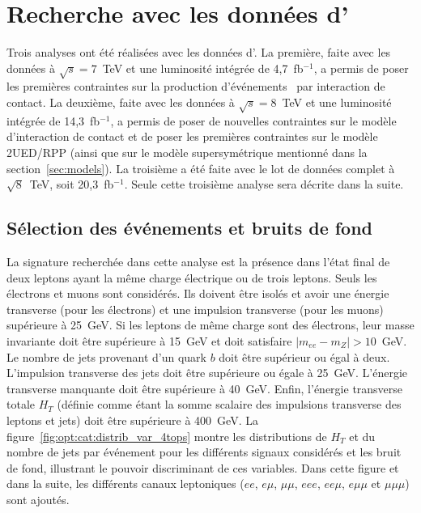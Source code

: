 \section{Recherche avec les donn\'ees d'\ATLAS}
\label{sec:analyseFourTops}

Trois analyses ont \'et\'e r\'ealis\'ees avec les donn\'ees d'\ATLAS. La premi\`ere, faite avec les donn\'ees \`a $\sqrt{s}=7$~TeV et une luminosit\'e int\'egr\'ee de 4,7~fb$^{-1}$, a permis de poser les premi\`eres contraintes sur la production d'\'ev\'enements \fourtop~par interaction de contact. La deuxi\`eme, faite avec les donn\'ees \`a $\sqrt{s}=8$~TeV et une luminosit\'e int\'egr\'ee de 14,3~fb$^{-1}$, a permis de poser de nouvelles contraintes sur le mod\`ele d'interaction de contact et de poser les premi\`eres contraintes sur le mod\`ele 2UED/RPP (ainsi que sur le mod\`ele supersym\'etrique mentionn\'e dans la section~\ref{sec:models}). La troisi\`eme a \'et\'e faite avec le lot de donn\'ees complet \`a $\sqrt{8}$~TeV, soit 20,3~fb$^{-1}$. Seule cette troisi\`eme analyse sera d\'ecrite dans la suite.

\subsection{S\'election des \'ev\'enements et bruits de fond}

La signature recherch\'ee dans cette analyse est la pr\'esence dans l'\'etat final de deux leptons ayant la m\^eme charge \'electrique ou de trois leptons. 
Seuls les \'electrons et muons sont consid\'er\'es. 
Ils doivent \^etre isol\'es et avoir une \'energie transverse (pour les \'electrons) et une impulsion transverse (pour les muons) sup\'erieure \`a 25~GeV. 
Si les leptons de m\^eme charge sont des \'electrons, leur masse invariante doit \^etre sup\'erieure \`a 15~GeV et doit satisfaire $|m_{ee}-m_Z| > 10$~GeV. 
Le nombre de jets provenant d'un quark $b$ doit \^etre sup\'erieur ou \'egal \`a deux. 
L'impulsion transverse des jets doit \^etre sup\'erieure ou \'egale \`a 25~GeV. L'\'energie transverse manquante doit \^etre sup\'erieure \`a 40~GeV. 
Enfin, l'\'energie transverse totale $H_T$ (d\'efinie comme \'etant la somme scalaire des impulsions transverse des leptons et jets) doit \^etre sup\'erieure \`a 400~GeV. 
La figure~\ref{fig:opt:cat:distrib_var_4tops} montre les distributions de $H_T$ et du nombre de jets par \'ev\'enement pour les diff\'erents signaux consid\'er\'es et les bruit de fond, illustrant le pouvoir discriminant de ces variables. 
Dans cette figure et dans la suite, les diff\'erents canaux leptoniques ($ee$, $e\mu$, $\mu\mu$, $eee$, $ee\mu$, $e\mu\mu$ et $\mu\mu\mu$) sont ajout\'es. 

